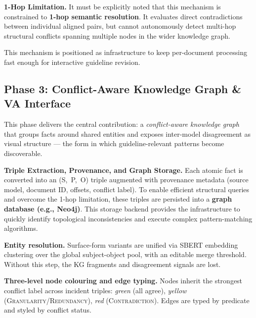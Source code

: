 \documentclass[11pt]{article}
\begin{document}
\textbf{1-Hop Limitation.} It must be explicitly noted that this mechanism is constrained to \textbf{1-hop semantic resolution}. It evaluates direct contradictions between individual aligned pairs, but cannot autonomously detect multi-hop structural conflicts spanning multiple nodes in the wider knowledge graph.

This mechanism is positioned as infrastructure to keep per-document processing fast enough for interactive guideline revision.

\subsection*{Phase 3: Conflict-Aware Knowledge Graph \& VA Interface}

This phase delivers the central contribution: a \textit{conflict-aware knowledge graph} that groups facts around shared entities and exposes inter-model disagreement as visual structure --- the form in which guideline-relevant patterns become discoverable.

\textbf{Triple Extraction, Provenance, and Graph Storage.} Each atomic fact is converted
into an (S,~P,~O) triple augmented with provenance metadata (source model, document ID, offsets, conflict label).
To enable efficient structural queries and overcome the 1-hop limitation, these triples are persisted into a \textbf{graph database (e.g., Neo4j)}.
This storage backend provides the infrastructure to quickly identify topological inconsistencies and execute complex pattern-matching algorithms.

\textbf{Entity resolution.} Surface-form variants
are unified via SBERT embedding clustering over the global subject-object pool, with
an editable merge threshold.
Without this step, the KG fragments and disagreement signals are lost.

\textbf{Three-level node colouring and edge typing.} Nodes inherit the
strongest conflict label across incident triples:
\textit{green} (all agree),
\textit{yellow} (\textsc{Granularity}/\textsc{Redundancy}),
\textit{red} (\textsc{Contradiction}).
Edges are typed by predicate and styled by conflict status.
\end{document}
